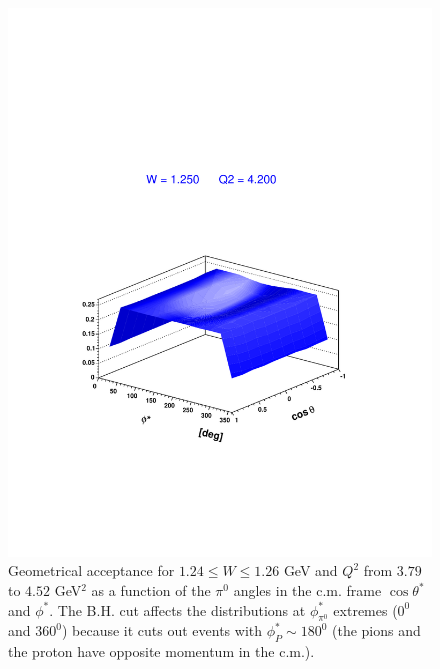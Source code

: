 \begin{figure}[h]
 \begin{center}
 \includegraphics[width = 12cm, bb=80 120 500 600]{acceptance/img/geom_acc_tp} 
  \caption[Geometrical acceptance for $W = 1.25 \pm 0.01$ GeV and  $Q^2$ from $3.79$ to $4.52$ GeV$^2$
                     as a function of $\cos\theta^*$ and $\phi^*$]
          { Geometrical acceptance for $1.24 \le W \le 1.26$ GeV and  $Q^2$ 
	             from $3.79$ to $4.52$ GeV$^2$
                     as a function of the $\pi^0$ angles in the c.m. frame 
		     $\cos\theta^*$ and $\phi^*$. The B.H. cut affects
		     the distributions at $\phi_{\pi^0}^*$ extremes ($0^0$ and $360^0$) 
		     because it cuts out events 
		     with $\phi_P^* \sim 180^0$ (the pions and the proton have opposite momentum 
		     in the c.m.).}
 \label{fig:geom_acctp}
 \end{center}
\end{figure}



